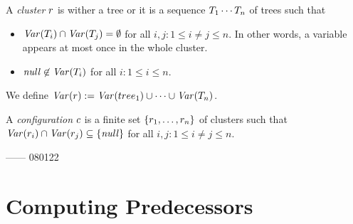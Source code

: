 A {\it cluster} $r$ is wither a tree or it is
a sequence $T_1\cdots T_n$ of trees such that
\begin{itemize}
\item
${\it Var}\!\left(T_i\right)\cap{\it Var}\!\left(T_j\right)=\emptyset$
 for all $i,j:1\leq i\neq j\leq n$.
%
In other words, a variable appears at most once in the whole cluster.
\item
${\it null}\not\in{\it Var}\!\left(T_i\right)$ for all $i:1\leq i\leq n$.
% 
\end{itemize}
%
We define ${\it Var}\!\left(r\right):={\it Var}\!\left(tree_1\right)\cup\cdots\cup{\it Var}\!\left(T_n\right)$.
%

A {\it configuration} $c$ is a finite set $\left\{r_1,\ldots,r_n\right\}$ of clusters
such that ${\it Var}\!\left(r_i\right)\cap{\it Var}\!\left(r_j\right)\subseteq\left\{{\it null}\right\}$ 
for all $i,j:1\leq i\neq j\leq n$.
%

------
080122


\section{Computing Predecessors}

